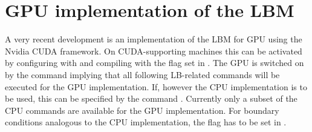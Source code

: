 \section{GPU implementation of the LBM}
A very recent development is an implementation of the LBM for GPU using
the Nvidia CUDA framework. On CUDA-supporting machines this can be activated
by configuring with  and compiling
with the   flag set in . The GPU is switched on
by the command  implying that all following LB-related commands
will be executed for the GPU implementation. If, however the CPU implementation
is to be used, this can be specified by the command  .
Currently only a subset of
the CPU commands are available for the GPU implementation.
For boundary conditions analogous to the CPU implementation, the flag  
has to be set in .
